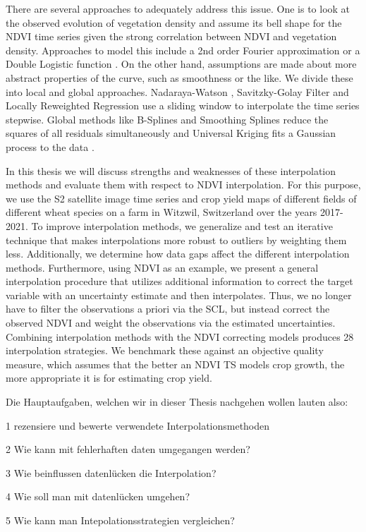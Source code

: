 There are several approaches to adequately address this issue. One is to look at the observed evolution of vegetation density and assume its bell shape for the NDVI time series given the strong correlation between NDVI and vegetation density. Approaches to model this include a 2nd order Fourier approximation \citep{stockliEuropeanPlantPhenology2004} or a Double Logistic function \citep{beckImprovedMonitoringVegetation2006}.
On the other hand, assumptions are made about more abstract properties of the curve, such as smoothness or the like. We divide these into local and global approaches. Nadaraya-Watson \citep{strbacEstimationEvapotrasnpirationUrban2017}, Savitzky-Golay Filter \citep{chenSimpleMethodReconstructing2004a} and Locally Reweighted Regression \citep{omoriAssessmentPaddyFields2021} use a sliding window to interpolate the time series stepwise. Global methods like B-Splines \citep{gurungPredictingEnhancedVegetation2009} and Smoothing Splines \citep{caiPerformanceSmoothingMethods2017} reduce the squares of all residuals simultaneously and Universal Kriging fits a Gaussian process to the data \citep{chandolaScalableTimeSeries2010}.




In this thesis we will discuss strengths and weaknesses of these interpolation methods and evaluate them with respect to NDVI interpolation. For this purpose, we use the S2 satellite image time series and crop yield maps of different fields of different wheat species on a farm in Witzwil, Switzerland over the years 2017-2021.
To improve interpolation methods, we generalize and test an iterative technique that makes interpolations more robust to outliers by weighting them less. Additionally, we determine how data gaps affect the different interpolation methods. Furthermore, using NDVI as an example, we present a general interpolation procedure that utilizes additional information to correct the target variable with an uncertainty estimate and then interpolates. Thus, we no longer have to filter the observations a priori via the SCL, but instead correct the observed NDVI and weight the observations via the estimated uncertainties. Combining interpolation methods with the NDVI correcting models produces 28 interpolation strategies. We benchmark these against an objective quality measure, which assumes that the better an NDVI TS models crop growth, the more appropriate it is for estimating crop yield.

Die Hauptaufgaben, welchen wir in dieser Thesis nachgehen wollen lauten also:
\begin{Nenumerate}
    \item 1 rezensiere und bewerte verwendete Interpolationsmethoden
    \item 2 Wie kann mit fehlerhaften daten umgegangen werden?
    \item 3 Wie beinflussen datenlücken die Interpolation?
    \item 4 Wie soll man mit datenlücken umgehen?
    \item 5 Wie kann man Intepolationsstrategien vergleichen?
\end{Nenumerate}

